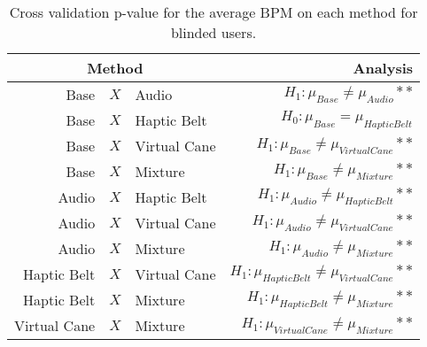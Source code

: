 
\begin{table}[!htb]
\centering
\caption{Cross validation p-value for the average BPM on each method for blinded users.}
\label{tab:lsd_bpm_two_way_blind}
\begin{tabular}{rclr}
\toprule
      \multicolumn{3}{c}{Method} &                                           Analysis \\
\midrule
              Base & $X$ & Audio &               $H_1 : \mu_{Base} \ne \mu_{Audio}**$ \\
        Base & $X$ & Haptic Belt &             $H_0 : \mu_{Base} = \mu_{Haptic Belt}$ \\
       Base & $X$ & Virtual Cane &        $H_1 : \mu_{Base} \ne \mu_{Virtual Cane}**$ \\
            Base & $X$ & Mixture &             $H_1 : \mu_{Base} \ne \mu_{Mixture}**$ \\
       Audio & $X$ & Haptic Belt &        $H_1 : \mu_{Audio} \ne \mu_{Haptic Belt}**$ \\
      Audio & $X$ & Virtual Cane &       $H_1 : \mu_{Audio} \ne \mu_{Virtual Cane}**$ \\
           Audio & $X$ & Mixture &            $H_1 : \mu_{Audio} \ne \mu_{Mixture}**$ \\
Haptic Belt & $X$ & Virtual Cane & $H_1 : \mu_{Haptic Belt} \ne \mu_{Virtual Cane}**$ \\
     Haptic Belt & $X$ & Mixture &      $H_1 : \mu_{Haptic Belt} \ne \mu_{Mixture}**$ \\
    Virtual Cane & $X$ & Mixture &     $H_1 : \mu_{Virtual Cane} \ne \mu_{Mixture}**$ \\
\bottomrule
\end{tabular}
\end{table}

